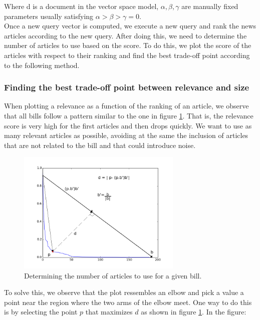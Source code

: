 Where d is a document in the vector space model, $\alpha, \beta, \gamma $ are manually fixed parameters usually satisfying $\alpha > \beta > \gamma = 0$. \\

Once a new query vector is computed, we execute a new query and rank the news articles according to the new query. After doing this, we need to determine the number of articles to use based on the score. To do this, we plot the score of the articles with respect to their ranking and find the best trade-off point according to the following method.

\subsubsection{Finding the best trade-off point between relevance and size}\label{subsec:elbow}

When plotting a relevance as a function of the ranking of an article, we observe that all bills follow a pattern similar to the one in figure \ref{fig:articles-topic-threshold}. That is, the relevance score is very high for the first articles and then drops quickly. We want to use as many relevant articles as possible, avoiding at the same the inclusion of articles that are not related to the bill and that could introduce noise. \\

\begin{figure}[h!]
    \centering
    \includegraphics[width=0.7\textwidth]{figs/articles-topic-threshold2}
    \caption{Determining the number of articles to use for a given bill.}
    \label{fig:articles-topic-threshold}
\end{figure}

To solve this, we observe that the plot ressembles an elbow and pick a value a point near the region where the two arms of the elbow meet. One way to do this is by selecting the point $p$ that maximizes $d$ as shown in figure \ref{fig:articles-topic-threshold}. In the figure:

